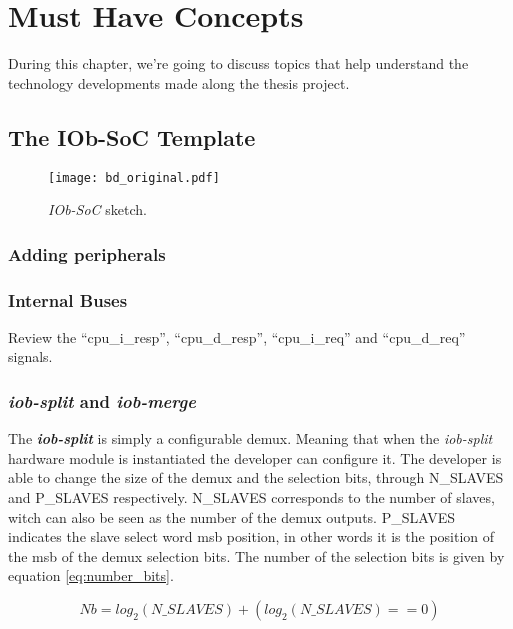 \chapter{Must Have Concepts}
During this chapter, we're going to discuss topics that help understand the technology developments made along the thesis project.

\section{The IOb-SoC Template}
\label{section:the_iob_soc_template}

\begin{figure}[!h]
    \centering
    \texttt{[image: bd\_original.pdf]}
    \caption{\textit{IOb-SoC} sketch.}
    \label{fig:bd_original}
\end{figure}

\subsection{Adding peripherals}
\subsection{Internal Buses}
Review the \enquote{cpu\_i\_resp}, \enquote{cpu\_d\_resp}, \enquote{cpu\_i\_req} and \enquote{cpu\_d\_req} signals.

\subsection{\textit{iob-split} and \textit{iob-merge}}
The \textbf{\textit{iob-split}} is simply a configurable \acrfull{demux}. Meaning that when the \textit{iob-split} hardware module is instantiated the developer can configure it. The developer is able to change the size of the \acrlong{demux} and the selection bits, through N\_SLAVES and P\_SLAVES respectively. N\_SLAVES corresponds to the number of slaves, witch can also be seen as the number of the \acrshort{demux} outputs. P\_SLAVES indicates the slave select word \acrfull{msb} position, in other words it is the position of the \acrshort{msb} of the \acrlong{demux} selection bits. The number of the selection bits is given by equation \ref{eq:number_bits}.

\begin{equation}
    \label{eq:number_bits}
    Nb = log_2(N\_SLAVES)+(log_2(N\_SLAVES)==0)
\end{equation}

